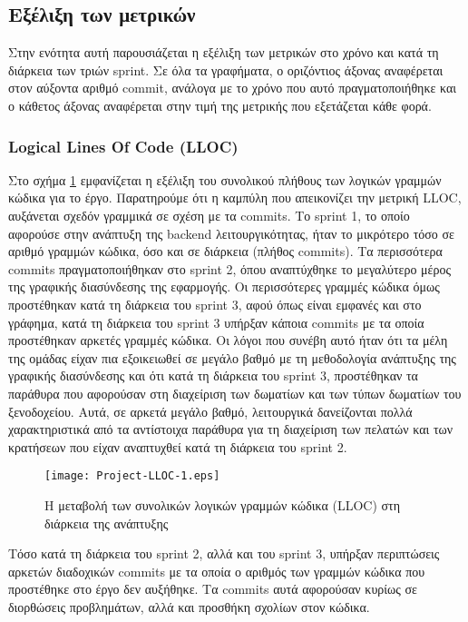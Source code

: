 \subsection{Εξέλιξη των μετρικών}

Στην ενότητα αυτή παρουσιάζεται η εξέλιξη των μετρικών στο χρόνο και
κατά τη διάρκεια των τριών sprint. Σε όλα τα γραφήματα, ο οριζόντιος
άξονας αναφέρεται στον αύξοντα αριθμό commit, ανάλογα με το χρόνο που
αυτό πραγματοποιήθηκε και ο κάθετος άξονας αναφέρεται στην τιμή της
μετρικής που εξετάζεται κάθε φορά.

\subsubsection{Logical Lines Of Code (LLOC)}
\label{section:projectLLOC}

Στο σχήμα \ref{fig:projectLLOC} εμφανίζεται η εξέλιξη του συνολικού
πλήθους των λογικών γραμμών κώδικα για το έργο. Παρατηρούμε ότι η
καμπύλη που απεικονίζει την μετρική LLOC, αυξάνεται σχεδόν γραμμικά σε
σχέση με τα commits. Το sprint 1, το οποίο αφορούσε στην ανάπτυξη της
backend λειτουργικότητας, ήταν το μικρότερο τόσο σε αριθμό γραμμών
κώδικα, όσο και σε διάρκεια (πλήθος commits). Τα περισσότερα commits
πραγματοποιήθηκαν στο sprint 2, όπου αναπτύχθηκε το μεγαλύτερο μέρος της
γραφικής διασύνδεσης της εφαρμογής. Οι περισσότερες γραμμές κώδικα όμως
προστέθηκαν κατά τη διάρκεια του sprint 3, αφού όπως είναι εμφανές και
στο γράφημα, κατά τη διάρκεια του sprint 3 υπήρξαν κάποια commits με τα
οποία προστέθηκαν αρκετές γραμμές κώδικα. Οι λόγοι που συνέβη αυτό ήταν
ότι τα μέλη της ομάδας είχαν πια εξοικειωθεί σε μεγάλο βαθμό με τη
μεθοδολογία ανάπτυξης της γραφικής διασύνδεσης και ότι κατά τη διάρκεια
του sprint 3, προστέθηκαν τα παράθυρα που αφορούσαν στη διαχείριση των
δωματίων και των τύπων δωματίων του ξενοδοχείου. Αυτά, σε αρκετά μεγάλο
βαθμό, λειτουργικά δανείζονται πολλά χαρακτηριστικά από τα αντίστοιχα
παράθυρα για τη διαχείριση των πελατών και των κρατήσεων που είχαν
αναπτυχθεί κατά τη διάρκεια του sprint 2.

\begin{figure}
\centering
\texttt{[image: Project-LLOC-1.eps]}
\caption{Η μεταβολή των συνολικών λογικών γραμμών κώδικα (LLOC) στη διάρκεια της ανάπτυξης}
\label{fig:projectLLOC}
\end{figure}

Τόσο κατά τη διάρκεια του sprint 2, αλλά και του sprint 3,
υπήρξαν περιπτώσεις αρκετών διαδοχικών commits με τα οποία ο
αριθμός των γραμμών κώδικα που προστέθηκε στο έργο δεν αυξήθηκε.
Τα commits αυτά αφορούσαν κυρίως σε διορθώσεις προβλημάτων, αλλά
και προσθήκη σχολίων στον κώδικα.

